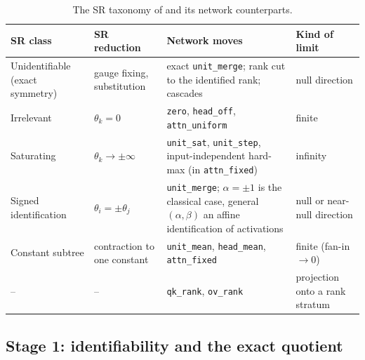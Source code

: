 \documentclass[11pt,a4paper]{article}
\theoremstyle{definition}
\newcommand{\code}[1]{\texttt{#1}}
\begin{document}
\begin{table}[t]
\centering\footnotesize
\caption{The SR taxonomy of \citet{guidetti2026emergent} and its network counterparts.}
\label{tab:taxonomy}
\renewcommand{\arraystretch}{1.2}
\begin{tabularx}{\textwidth}{@{}p{3.3cm}p{3.2cm}Xp{2.4cm}@{}}
\toprule
\textbf{SR class} & \textbf{SR reduction} & \textbf{Network moves} & \textbf{Kind of limit}\\
\midrule
Unidentifiable (exact symmetry) & gauge fixing, substitution & exact \code{unit\_merge}; rank cut to the identified rank; cascades & null direction\\
Irrelevant & $\theta_k=0$ & \code{zero}, \code{head\_off}, \code{attn\_uniform} & finite\\
Saturating & $\theta_k\to\pm\infty$ & \code{unit\_sat}, \code{unit\_step}, input-independent hard-max (in \code{attn\_fixed}) & infinity\\
Signed identification & $\theta_i=\pm\theta_j$ & \code{unit\_merge}; $\alpha=\pm1$ is the classical case, general $(\alpha,\beta)$ an affine identification of activations & null or near-null direction\\
Constant subtree & contraction to one constant & \code{unit\_mean}, \code{head\_mean}, \code{attn\_fixed} & finite (fan-in $\to0$)\\
-- & -- & \code{qk\_rank}, \code{ov\_rank} & projection onto a rank stratum\\
\bottomrule
\end{tabularx}
\end{table}

\subsection{Stage 1: identifiability and the exact quotient}
\label{sec:stage1}
\end{document}
